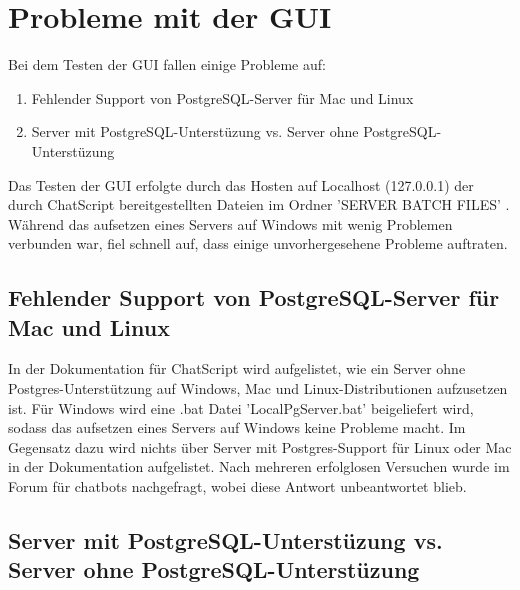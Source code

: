 \section{Probleme mit der GUI}
\label{sec: Probleme mit der GUI}

Bei dem Testen der GUI fallen einige Probleme auf: 

\begin{enumerate}
\item{Fehlender Support von PostgreSQL-Server für Mac und Linux}
\item{Server mit PostgreSQL-Unterstüzung vs. Server ohne PostgreSQL-Unterstüzung}
\end{enumerate}

Das Testen der GUI erfolgte durch das Hosten auf Localhost (127.0.0.1) der durch ChatScript bereitgestellten Dateien im Ordner 'SERVER BATCH FILES' \citep{chatscript2019}. Während das aufsetzen eines Servers auf Windows mit wenig Problemen verbunden war, fiel schnell auf, dass einige unvorhergesehene Probleme auftraten. 

\subsection{Fehlender Support von PostgreSQL-Server für Mac und Linux}
\label{sec:Fehlender Support von PostgreSQL-Server für Mac und Linux}

In der Dokumentation für ChatScript wird aufgelistet, wie ein Server ohne Postgres-Unterstützung auf Windows, Mac und Linux-Distributionen aufzusetzen ist. Für Windows wird eine .bat Datei 'LocalPgServer.bat' beigeliefert wird, sodass das aufsetzen eines Servers auf Windows keine Probleme macht. Im Gegensatz dazu wird nichts über Server mit Postgres-Support für Linux oder Mac in der Dokumentation aufgelistet. Nach mehreren erfolglosen Versuchen wurde im Forum für chatbots nachgefragt, wobei diese Antwort unbeantwortet blieb. 

\subsection{Server mit PostgreSQL-Unterstüzung vs. Server ohne PostgreSQL-Unterstüzung}
\label{sec: Server mit PostgreSQL-Unterstüzung vs. Server ohne PostgreSQL-Unterstüzung}

